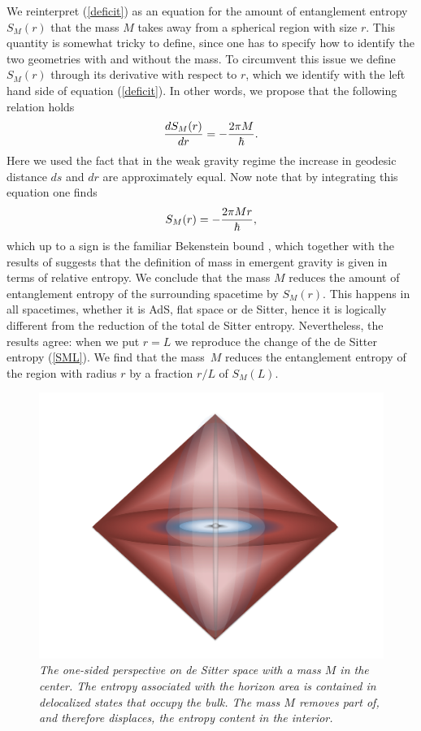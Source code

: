 \documentclass[a4paper,12pt]{article}
\newcommand{\be}{\begin{equation}}
\newcommand{\ee}{\end{equation}}
\begin{document}
We   reinterpret (\ref{deficit}) as an equation for the amount of entanglement entropy $S_M(r)$ that the mass $M$ takes away from a spherical region with size $r$. This quantity is somewhat tricky to define, since one has to specify how to identify the two geometries with and without the mass. To circumvent this issue we define $S_M(r)$ through its derivative with respect to $r$, which we identify with   the left hand side of equation (\ref{deficit}). In other words, we 
propose that the following relation holds
\be
\label{SMder}
{dS_M(r)\over dr} = -{2\pi M\over \hbar}.
\ee  
Here we used the fact that in the weak gravity regime the increase in geodesic distance $ds$ and 
$dr$ are approximately equal.  Now note that by integrating this equation one finds 
\be
\label{SMr}
S_M(r) =-{2\pi Mr\over \hbar},
\ee  
which up to a sign is the familiar Bekenstein bound \cite{BekensteinBound}, which together with the results of \cite{CasiniBekenstein} suggests that the definition of mass in emergent gravity is given in terms of relative entropy.  We conclude that the mass $M$ reduces the amount of entanglement entropy of the 
surrounding spacetime by $S_M(r)$.  This happens in all spacetimes, whether it is AdS, flat space or de Sitter, hence it is logically different from the reduction of the total de Sitter entropy.  Nevertheless, the results agree: when we put $r=L$ we reproduce the change of the de Sitter entropy (\ref{SML}).  We find that the mass~$M$ reduces the entanglement entropy of the region with radius $r$ by a fraction $r/L$ of $S_M(L)$. 

 \begin{figure}[btp]
\begin{center}
\vspace{-1.2 cm}
\includegraphics[scale=0.36]{ThermalStaticPatch.pdf}
\vspace{-1.0 cm}
\end{center}
\caption{\small \it The one-sided perspective on de Sitter space with a mass $M$ in the center. The entropy associated with the horizon area is contained in delocalized states that occupy the bulk. The mass $M$ removes part of, and therefore displaces, the entropy content in the interior.}
\end{figure}
 
\end{document}
